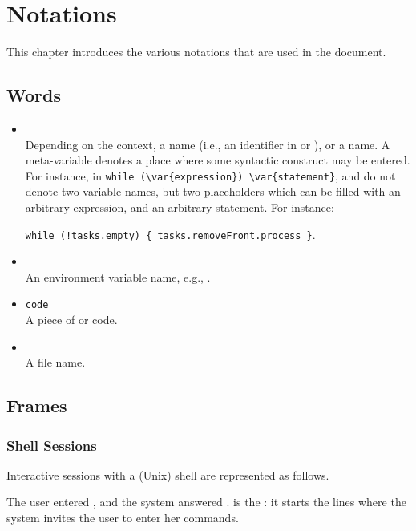\chapter{Notations}
\label{sec:notations}

This chapter introduces the various notations that are used in the
document.

\section{Words}

\begin{itemize}
\item {}\\
  Depending on the context, a  name (i.e., an identifier
  in \Cxx or \us), or a  name.  A meta-variable
  denotes a place where some syntactic construct may be entered.  For
  instance, in \lstinline|while (\var{expression}) \var{statement}|,
   and  do not denote two variable
  names, but two placeholders which can be filled with an arbitrary
  expression, and an arbitrary statement.  For instance:

  \lstinline|while (!tasks.empty) { tasks.removeFront.process }|.

\item {}\\
  An environment variable name, e.g., .
\item \lstinline|code|\\
  A piece of \us or \Cxx code.
\item {}\\
  A file name.
\end{itemize}

\section{Frames}

\subsection{Shell Sessions}
\label{sec:notations:shell}

Interactive sessions with a (Unix) shell are represented as follows.


The user entered , and the system answered
.  \samp{\$} is the : it starts the lines where
the system invites the user to enter her commands.

